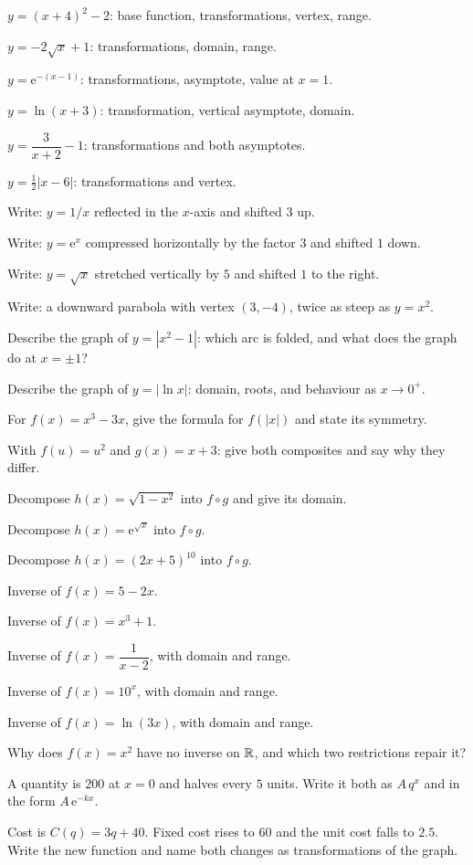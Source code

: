 \begin{problems}
  \item $y=(x+4)^{2}-2$: base function, transformations, vertex, range.
  \item $y=-2\sqrt{x}+1$: transformations, domain, range.
  \item $y=\mathrm{e}^{-(x-1)}$: transformations, asymptote, value at
        $x=1$.
  \item $y=\ln(x+3)$: transformation, vertical asymptote, domain.
  \item $y=\dfrac{3}{x+2}-1$: transformations and both asymptotes.
  \item $y=\tfrac12|x-6|$: transformations and vertex.
  \item Write: $y=1/x$ reflected in the $x$-axis and shifted $3$ up.
  \item Write: $y=\mathrm{e}^{x}$ compressed horizontally by the factor
        $3$ and shifted $1$ down.
  \item Write: $y=\sqrt{x}$ stretched vertically by $5$ and shifted $1$ to
        the right.
  \item Write: a downward parabola with vertex $(3,-4)$, twice as steep as
        $y=x^{2}$.
  \item Describe the graph of $y=|x^{2}-1|$: which arc is folded, and what
        does the graph do at $x=\pm1$?
  \item Describe the graph of $y=|\ln x|$: domain, roots, and behaviour as
        $x\to0^{+}$.
  \item For $f(x)=x^{3}-3x$, give the formula for $f(|x|)$ and state its
        symmetry.
  \item With $f(u)=u^{2}$ and $g(x)=x+3$: give both composites and say why
        they differ.
  \item Decompose $h(x)=\sqrt{1-x^{2}}$ into $f\circ g$ and give its
        domain.
  \item Decompose $h(x)=\mathrm{e}^{\sqrt{x}}$ into $f\circ g$.
  \item Decompose $h(x)=(2x+5)^{10}$ into $f\circ g$.
  \item Inverse of $f(x)=5-2x$.
  \item Inverse of $f(x)=x^{3}+1$.
  \item Inverse of $f(x)=\dfrac{1}{x-2}$, with domain and range.
  \item Inverse of $f(x)=10^{x}$, with domain and range.
  \item Inverse of $f(x)=\ln(3x)$, with domain and range.
  \item Why does $f(x)=x^{2}$ have no inverse on $\mathbb{R}$, and which two
        restrictions repair it?
  \item A quantity is $200$ at $x=0$ and halves every $5$ units. Write it
        both as $A\,q^{x}$ and in the form $A\,\mathrm{e}^{-kx}$.
  \item Cost is $C(q)=3q+40$. Fixed cost rises to $60$ and the unit cost
        falls to $2.5$. Write the new function and name both changes as
        transformations of the graph.
\end{problems}

